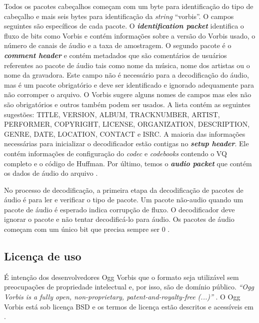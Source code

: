 Todos os pacotes cabeçalhos começam com um byte para identificação do tipo de cabeçalho e mais seis bytes para identificação da \textit{string} ``vorbis''. O campos seguintes são específicos de cada pacote. O \textbf{\textit{identification packet}} identifica o fluxo de bits como Vorbis e contém informações sobre a versão do Vorbis usado, o número de canais de áudio e a taxa de amostragem. O segundo pacote é o \textbf{\textit{comment header}} e contém metadados que são comentários de usuários referentes ao pacote de áudio tais como nome da música, nome dos artistas ou o nome da gravadora. Este campo não é necessário para a decodificação do áudio, mas é um pacote obrigatório e deve ser identificado e ignorado adequamente para não corromper o arquivo. O Vorbis sugere alguns nomes de campos mas eles não são obrigatórios e outros também podem ser usados. A lista contém as seguintes sugestões: TITLE, VERSION, ALBUM, TRACKNUMBER, ARTIST, PERFORMER, COPYRIGHT, LICENSE, ORGANIZATION, DESCRIPTION, GENRE, DATE, LOCATION, CONTACT e ISRC. A maioria das informações necessárias para inicializar o decodificador estão contigas no \textit{\textbf{setup header}}. Ele contém informações de configuração do \textit{codec} e \textit{codebooks} contendo o VQ completo e o código de Huffman. Por último, temos o \textbf{\textit{audio packet}} que contém os dados de áudio do arquivo \cite{vorbis}.

No processo de decodificação, a primeira etapa da decodificação de pacotes de áudio é para ler e verificar o tipo de pacote. Um pacote não-audio quando um pacote de áudio é esperado indica corrupção de fluxo. O decodificador deve ignorar o pacote e não tentar decodificá-lo para áudio. Os pacotes de áudio começam com um único bit que precisa sempre ser 0 \cite{vorbis}.

\subsection{Licença de uso}

É intenção dos desenvolvedores Ogg Vorbis que o formato seja utilizável sem preocupações de propriedade intelectual e, por isso, são de domínio público. \textit{``Ogg Vorbis is a fully open, non-proprietary, patent-and-royalty-free (...)''} \cite{license}. O Ogg Vorbis está sob licença BSD e os termos de licença estão descritos e acessíveis em \cite{licenseterms}.